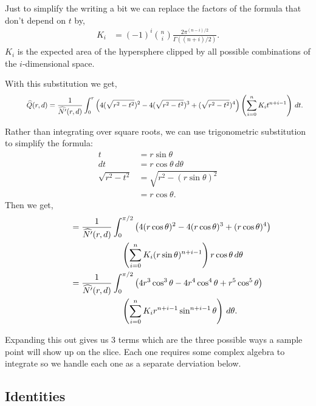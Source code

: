 Just to simplify the writing a bit we can replace the factors of the formula
that don't depend on $t$ by,
\begin{align*}
  K_i &= (-1)^i {n \choose i} \frac{2\pi^{(n-i)/2}}{\Gamma((n+i)/2)}
  \text{.}
\end{align*}
$K_i$ is the expected area of the hypersphere clipped by all possible
combinations of the $i$-dimensional space.  

With this substitution we get,
\begin{align*}
\phantom{\expfrags}
     \expfrags &= \frac{1}{\exppts{r}} \int_0^r 
        \left(4(\sqrt{r^2-t^2})^2 - 4(\sqrt{r^2-t^2})^3 + (\sqrt{r^2-t^2})^4\right) 
        \left(
          \sum_{i=0}^{n} K_i t^{n+i-1}
        \right) \, dt 
        \text{.}
\end{align*}

Rather than integrating over square roots, we can use trigonometric 
substitution to simplify the formula:
\begin{align*}
t  &= r \sin \theta \\
dt &= r \cos \theta \, d\theta \\
\sqrt{r^2 - t^2} &= \sqrt{r^2 - (r\sin \theta)^2} \\
                 &= r \cos \theta 
                 \text{.}
\end{align*}
Then we get,
\begin{align*}
\phantom{\expfrags}
     &= \frac{1}{\exppts{r}} \int_0^{\pi/2}
        \left(4(r\cos \theta)^2 - 4(r\cos \theta)^3 + (r\cos \theta)^4\right) \\
     &\qquad\qquad\qquad
        \left(
          \sum_{i=0}^{n} K_i (r\sin \theta)^{n+i-1} \right) 
        r\cos \theta \, d\theta \\
     &= \frac{1}{\exppts{r}} \int_0^{\pi/2}
        \left(4r^3\cos^3 \theta - 4r^4\cos^4 \theta + r^5\cos^5 \theta\right) \\
     &\qquad\qquad\qquad
        \left(
          \sum_{i=0}^{n} K_i r^{n+i-1}\sin^{n+i-1} \theta 
        \right) \, d\theta
        \text{.}
\end{align*}

Expanding this out gives us 3 terms which are the three possible ways a 
sample point will show up on the slice.  Each one requires some complex
algebra to integrate so we handle each one as a separate derviation below.

\subsection{Identities}

